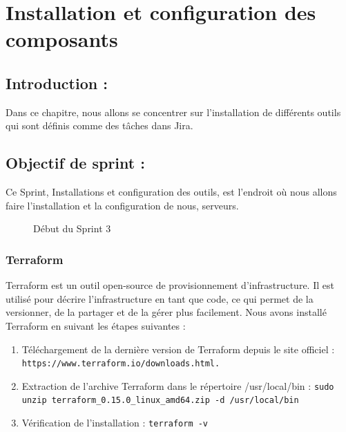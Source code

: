 \chapter{Installation et configuration des composants}
\label{ch:install}

\section{Introduction :}

Dans ce chapitre, nous allons se concentrer sur l’installation de différents outils qui sont définis comme des tâches dans Jira.

\section{Objectif de sprint :}

Ce Sprint, Installations et configuration des outils, est l’endroit où nous allons faire l’installation et la configuration de nous, serveurs.

\begin{figure}[h]
\centering
\caption{Début du Sprint 3}
\end{figure}

\subsection*{Terraform}

Terraform est un outil open-source de provisionnement d’infrastructure. Il est utilisé pour décrire l’infrastructure en tant que code, ce qui permet de la versionner, de la partager et de la gérer plus facilement. Nous avons installé Terraform en suivant les étapes suivantes :

\begin{enumerate}
\item Téléchargement de la dernière version de Terraform depuis le site officiel :  
\texttt{https://www.terraform.io/downloads.html.}
\end{enumerate}
\begin{enumerate}
\setcounter{enumi}{1}
\item Extraction de l’archive Terraform dans le répertoire /usr/local/bin :  
\texttt{sudo unzip terraform\_0.15.0\_linux\_amd64.zip -d /usr/local/bin}

\item Vérification de l’installation :  
\texttt{terraform -v}
\end{enumerate}

